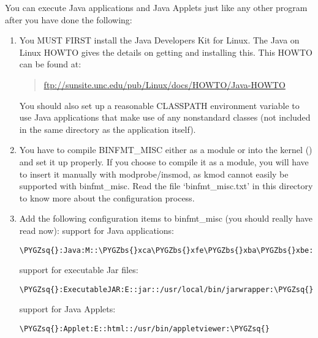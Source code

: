\documentclass[a4paper,8pt,english]{sphinxmanual}
\def\PYGZbs{\char`\\}
\def\PYGZsq{\char`\'}
\renewcommand\PYGZsq{\textquotesingle}
\begin{document}
You can execute Java applications and Java Applets just like any
other program after you have done the following:
\begin{enumerate}
\item {} 
You MUST FIRST install the Java Developers Kit for Linux.
The Java on Linux HOWTO gives the details on getting and
installing this. This HOWTO can be found at:
\begin{quote}

\href{ftp://sunsite.unc.edu/pub/Linux/docs/HOWTO/Java-HOWTO}{ftp://sunsite.unc.edu/pub/Linux/docs/HOWTO/Java-HOWTO}
\end{quote}

You should also set up a reasonable CLASSPATH environment
variable to use Java applications that make use of any
nonstandard classes (not included in the same directory
as the application itself).

\item {} 
You have to compile BINFMT\_MISC either as a module or into
the kernel () and set it up properly.
If you choose to compile it as a module, you will have
to insert it manually with modprobe/insmod, as kmod
cannot easily be supported with binfmt\_misc.
Read the file `binfmt\_misc.txt' in this directory to know
more about the configuration process.

\item {} 
Add the following configuration items to binfmt\_misc
(you should really have read  now):
support for Java applications:

\begin{Verbatim}[commandchars=\\\{\}]
\PYGZsq{}:Java:M::\PYGZbs{}xca\PYGZbs{}xfe\PYGZbs{}xba\PYGZbs{}xbe::/usr/local/bin/javawrapper:\PYGZsq{}
\end{Verbatim}

support for executable Jar files:

\begin{Verbatim}[commandchars=\\\{\}]
\PYGZsq{}:ExecutableJAR:E::jar::/usr/local/bin/jarwrapper:\PYGZsq{}
\end{Verbatim}

support for Java Applets:

\begin{Verbatim}[commandchars=\\\{\}]
\PYGZsq{}:Applet:E::html::/usr/bin/appletviewer:\PYGZsq{}
\end{Verbatim}


\end{enumerate}
\end{document}
